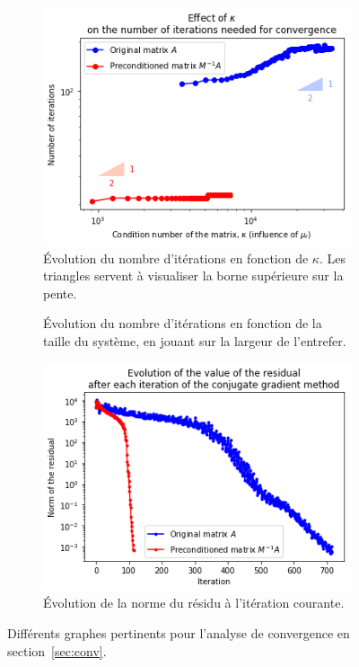 \documentclass[11pt]{article}
\begin{document}
\begin{figure}[H]
	\centering
	\begin{subfigure}[t]{0.28\textwidth}
		\centering
		\includegraphics[width=\linewidth]{iter_cond.png}
		\caption{Évolution du nombre d'itérations en fonction de $\kappa$. Les triangles servent à visualiser la borne supérieure sur la pente.}
		\label{fig:iter_cond}
	\end{subfigure}\hfill
	\begin{subfigure}[t]{0.28\textwidth}
		\centering
		\caption{Évolution du nombre d'itérations en fonction de la taille du système, en jouant sur la largeur de l'entrefer.}
		\label{fig:iter_n}
	\end{subfigure}\hfill
	\begin{subfigure}[t]{0.28\textwidth}
		\centering
		\includegraphics[width=\linewidth]{res_iter.png}
		\caption{Évolution de la norme du résidu à l'itération courante.}
		\label{fig:res_iter}
	\end{subfigure}
	\caption{Différents graphes pertinents pour l'analyse de convergence en section~\ref{sec:conv}.}
	\label{fig:conv_anal}
\end{figure}
\end{document}
